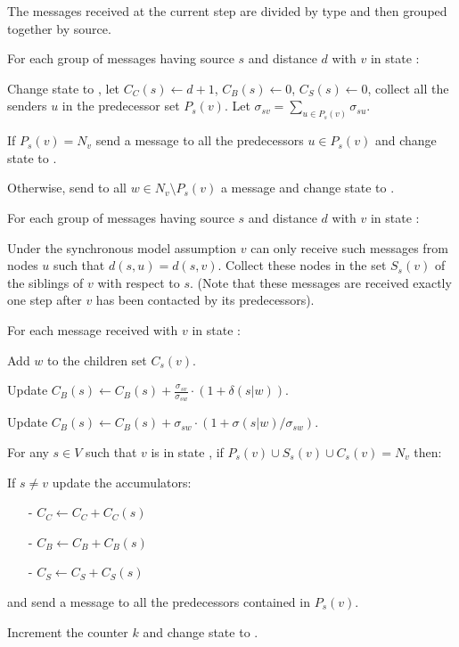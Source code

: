 \begin{algosteps}
  \item The messages received at the current step are divided by type and then grouped together by source.
  \item For each group of  messages having source $s$ and distance $d$ with $v$ in state :
  \begin{algosteps}
    \item Change state to , let $C_C(s) \gets d+1$, $C_B(s) \gets 0$, $C_S(s) \gets 0$, collect all the senders $u$ in the predecessor set $P_s(v)$. Let $\sigma_{sv} = \sum_{u \in P_s(v)} \sigma_{su}$.
    \item If $P_s(v) = N_v$ send a  message to all the predecessors $u \in P_s(v)$ and change state to . 
    \item Otherwise, send to all $w \in N_v \setminus P_s(v)$ a  message and change state to .
  \end{algosteps}
    \item For each group of  messages having source $s$ and distance $d$ with $v$ in state :
    \begin{algosteps}
      \item Under the synchronous model assumption $v$ can only receive such messages from nodes $u$ such that $d(s,u) = d(s,v)$. Collect these nodes in the set $S_s(v)$ of the siblings of $v$ with respect to $s$. (Note that these messages are received exactly one step after $v$ has been contacted by its predecessors).
    \end{algosteps}
  \item For each  message received with $v$ in state :
  \begin{algosteps}
      \item Add $w$ to the children set $C_s(v)$.
      \item Update $C_B(s) \gets C_B(s) + \frac{\sigma_{sv}}{\sigma_{sw}} \cdot (1 + \delta(s|w))$.
      \item Update $C_B(s) \gets C_B(s) + \sigma_{sw} \cdot ( 1 + \sigma(s|w)/\sigma_{sw} )$.
    \end{algosteps}
  \item For any $s \in V$ such that $v$ is in state , if $P_s(v) \cup S_s(v) \cup C_s(v) = N_v$ then:
  \begin{algosteps}
      \item If $s \neq v$ update the accumulators:
      \begin{itemize}
        \item[-] $C_C \gets C_C + C_C(s)$
        \item[-] $C_B \gets C_B + C_B(s)$
        \item[-] $C_S \gets C_S + C_S(s)$
      \end{itemize}
      and send a  message to all the predecessors contained in $P_s(v)$.
      \item Increment the counter $k$ and change state to .
    \end{algosteps}
\end{algosteps}
